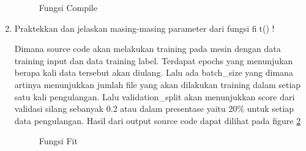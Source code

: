 \begin{enumerate}
	\begin{figure}[!htbp]
		\caption{Fungsi Compile}
		\label{YNC6-14}
	\end{figure} 	

\item Praktekkan dan jelaskan masing-masing parameter dari fungsi fit() !
	
	\subitem Dimana source code akan melakukan training pada mesin dengan data training input dan data training label. Terdapat epochs yang menunjukan berapa kali data tersebut akan diulang. Lalu ada batch\_size yang dimana artinya menunjukkan jumlah file yang akan dilakukan training dalam setiap satu kali pengulangan. Lalu validation\_split akan menunjukkan score dari validasi silang sebanyak 0.2 atau dalam presentase yaitu 20\% untuk setiap data pengulangan. Hasil dari output source code dapat dilihat pada figure \ref{YNC6-15}

	\begin{figure}[!htbp]
		\caption{Fungsi Fit}
		\label{YNC6-15}
	\end{figure} 	


\end{enumerate}
